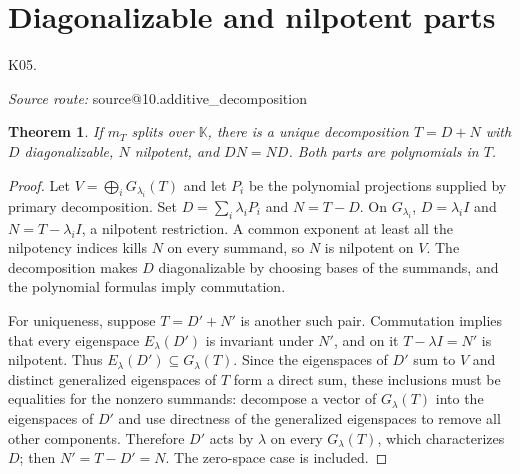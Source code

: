 \documentclass[11pt,a4paper]{book}
\makeatletter
\newtheorem{theorem}{Theorem}[chapter]
\theoremstyle{definition}\newtheorem{definition}[theorem]{Definition}
\theoremstyle{remark}\newtheorem{remark}[theorem]{Remark}
\newcommand{\K}{\mathbb K}\newcommand{\R}{\mathbb R}\newcommand{\C}{\mathbb C}
\newcommand{\Kentry}[2]{\section{#2}\label{k:#1}\noindent\textsf{\small K05.\detokenize{#1}}\par
  \begingroup\small\color{black!65}\textit{Source route: }\csname source@#1\endcsname\par\endgroup}
\makeatother
\begin{document}
\Kentry{10.additive_decomposition}{Diagonalizable and nilpotent parts}
\begin{theorem}
If $m_T$ splits over $\K$, there is a unique decomposition $T=D+N$ with $D$ diagonalizable, $N$ nilpotent, and $DN=ND$. Both parts are polynomials in $T$.
\end{theorem}
\begin{proof}
Let $V=\bigoplus_iG_{\lambda_i}(T)$ and let $P_i$ be the polynomial projections supplied by primary decomposition. Set $D=\sum_i\lambda_iP_i$ and $N=T-D$. On $G_{\lambda_i}$, $D=\lambda_iI$ and $N=T-\lambda_iI$, a nilpotent restriction. A common exponent at least all the nilpotency indices kills $N$ on every summand, so $N$ is nilpotent on $V$. The decomposition makes $D$ diagonalizable by choosing bases of the summands, and the polynomial formulas imply commutation.

For uniqueness, suppose $T=D'+N'$ is another such pair. Commutation implies that every eigenspace $E_\lambda(D')$ is invariant under $N'$, and on it $T-\lambda I=N'$ is nilpotent. Thus $E_\lambda(D')\subseteq G_\lambda(T)$. Since the eigenspaces of $D'$ sum to $V$ and distinct generalized eigenspaces of $T$ form a direct sum, these inclusions must be equalities for the nonzero summands: decompose a vector of $G_\lambda(T)$ into the eigenspaces of $D'$ and use directness of the generalized eigenspaces to remove all other components. Therefore $D'$ acts by $\lambda$ on every $G_\lambda(T)$, which characterizes $D$; then $N'=T-D'=N$. The zero-space case is included.
\end{proof}
\end{document}
